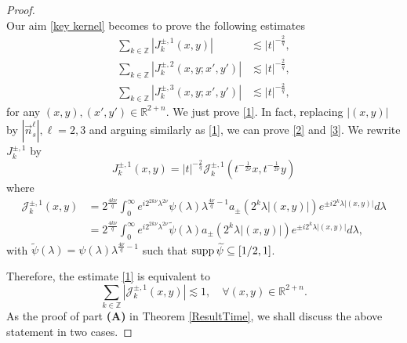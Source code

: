 \documentclass[a4paper,11pt, reqno]{amsart}
\numberwithin{equation}{section}
\theoremstyle{plain}
\theoremstyle{definition}
\theoremstyle{remark}
\def\supp{\hbox{supp\,}}
\begin{document}
\begin{proof}
\begin{equation*}
\end{equation*}
Our aim \eqref{key kernel} becomes to prove the following estimates
\begin{align}
\sum_{k\in\mathbb{Z}}|J_k^{\pm,1}(x,y)|&\lesssim |t|^{-\frac{2}{q}},\label{1}\\
\sum_{k\in\mathbb{Z}}|J_k^{\pm,2}(x,y;x',y')|&\lesssim |t|^{-\frac{2}{q}},\label{2}\\
\sum_{k\in\mathbb{Z}}|J_k^{\pm,3}(x,y;x',y')|&\lesssim |t|^{-\frac{2}{q}},\label{3}
\end{align}
for any $(x,y),(x',y')\in\mathbb{R}^{2+n}$. We just prove \eqref{1}. In fact, replacing $|(x,y)|$ by $|\overset{\rightarrow}{n}_s^\ell|, \ell=2,3$ and arguing similarly as \eqref{1}, we can prove \eqref{2} and \eqref{3}. We rewrite $J_k^{\pm,1}$ by
\begin{equation*}
J_k^{\pm,1}(x,y)=|t|^{-\frac{2}{q}}\mathcal{J}_k^{\pm,1}(t^{-\frac{1}{2\nu}}x,t^{-\frac{1}{2\nu}}y)
\end{equation*}
where
\begin{align*}
\mathcal{J}_k^{\pm,1}(x,y)&=2^\frac{4k\nu}{q}\int_0^\infty  e^{i2^{2k\nu}\lambda^{2\nu}} \psi(\lambda)\lambda^{\frac{4\nu}{q}-1}a_{\pm}(2^k\lambda|(x,y)|)e^{\pm i2^k\lambda|(x,y)|}d\lambda\\
&=2^\frac{4k\nu}{q}\int_0^\infty  e^{i2^{2k\nu}\lambda^{2\nu}} \widetilde{\psi}(\lambda)a_{\pm}(2^k\lambda|(x,y)|)e^{\pm i2^k\lambda|(x,y)|}d\lambda,
\end{align*}
with $\widetilde{\psi}(\lambda)=\psi(\lambda)\lambda^{\frac{4\nu}{q}-1}$ such that $\supp \widetilde{\psi}\subseteq [1/2,1]$.

Therefore, the estimate \eqref{1} is equivalent to
\begin{equation}\label{J}
\sum_{k\in\mathbb{Z}}|\mathcal{J}_k^{\pm,1}(x,y)|\lesssim 1,\quad \forall (x,y)\in\mathbb{R}^{2+n}.
\end{equation}
As the proof of part \textbf{(A)} in Theorem \ref{ResultTime}, we shall discuss the above statement in two cases.


\end{proof}
\end{document}
